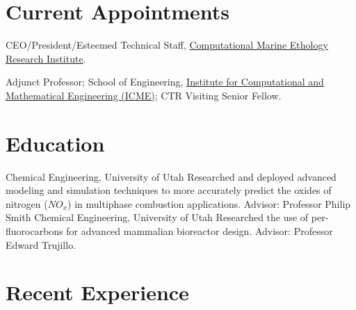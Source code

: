 \documentclass[letterpaper]{twentysecondcv_spd} %
\begin{document}
\section{Current Appointments}

\begin{twentyshort}

	 {CEO/President/Esteemed Technical Staff, \href{https://comeri.org}{Computational Marine Ethology Research Institute}.}

  	 {Adjunct Professor; School of Engineering, \href{https://profiles.stanford.edu/stefan-domino}{Institute for Computational and Mathematical Engineering (ICME)}; CTR Visiting Senior Fellow.}
		
  \end{twentyshort}
  
\section{Education}

\begin{twenty}
	 {\normalfont Chemical Engineering, University of Utah} {Researched and deployed advanced
modeling and simulation techniques to more accurately predict the oxides of nitrogen ($NO_x$) in multiphase combustion applications. Advisor: Professor Philip Smith}
	 {\normalfont Chemical Engineering, University of Utah} {Researched the use of per-fluorocarbons for advanced mammalian bioreactor design. Advisor: Professor Edward Trujillo.}
	
\end{twenty}

\section{Recent Experience}
\end{document}
